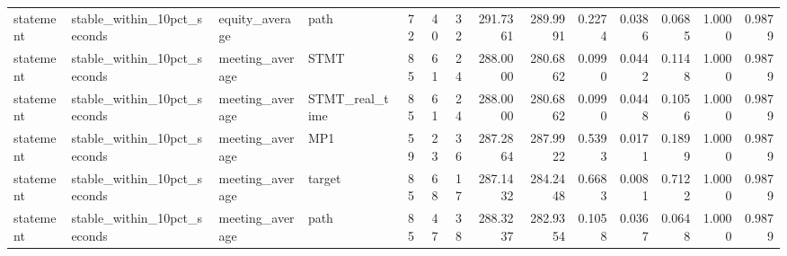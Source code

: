 \begin{tabular}{llllrrrrrrrrrr}
statement & stable_within_10pct_seconds & equity_average & path & 72 & 40 & 32 & 291.7361 & 289.9991 & 0.2274 & 0.0386 & 0.0685 & 1.0000 & 0.9879 \\
statement & stable_within_10pct_seconds & meeting_average & STMT & 85 & 61 & 24 & 288.0000 & 280.6862 & 0.0990 & 0.0442 & 0.1148 & 1.0000 & 0.9879 \\
statement & stable_within_10pct_seconds & meeting_average & STMT_real_time & 85 & 61 & 24 & 288.0000 & 280.6862 & 0.0990 & 0.0448 & 0.1056 & 1.0000 & 0.9879 \\
statement & stable_within_10pct_seconds & meeting_average & MP1 & 59 & 23 & 36 & 287.2864 & 287.9922 & 0.5393 & 0.0171 & 0.1899 & 1.0000 & 0.9879 \\
statement & stable_within_10pct_seconds & meeting_average & target & 85 & 68 & 17 & 287.1432 & 284.2448 & 0.6683 & 0.0081 & 0.7122 & 1.0000 & 0.9879 \\
statement & stable_within_10pct_seconds & meeting_average & path & 85 & 47 & 38 & 288.3237 & 282.9354 & 0.1058 & 0.0367 & 0.0648 & 1.0000 & 0.9879 \\
\bottomrule
\end{tabular}
